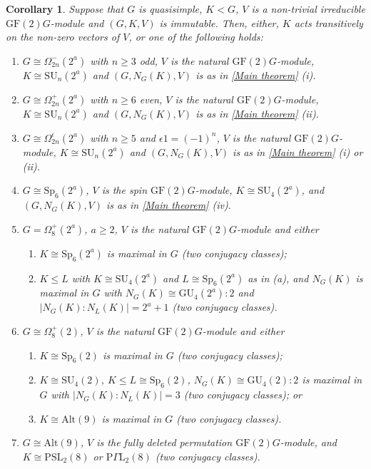 \documentclass[12pt]{amsart}
\newtheorem{corollary}[theorem]{Corollary}
\theoremstyle{remark}
\theoremstyle{notation}
\theoremstyle{definition}
\newcommand{\SU}{\mathrm{SU}}
\newcommand{\GF}{\mathrm{GF}}
\newcommand{\Sp}{\mathrm{Sp}}
\newcommand{\GU}{\mathrm{GU}}
\newcommand{\0}{\emptyset}
\newcommand{\PSL}{\mathrm{PSL}}
\newcommand{\Alt}{\mathrm{Alt}}
\begin{document}
 \begin{corollary}\label{Cor:Main Result} Suppose that $G$ is quasisimple, $K <G$, $V$ is a non-trivial irreducible $\GF(2)G$-module and $(G,K,V)$ is immutable.  Then, either, $K$ acts transitively on the non-zero vectors of $V$, or one of the following holds:
 \begin{enumerate}
 \item $G \cong \Omega_{2n}^-(2^a)$ with $n \ge 3$ odd,  $V$ is the natural $\GF(2)G$-module, $K \cong \SU_{n}(2^a)$ and $(G,N_G(K),V)$ is as in \cref{Main theorem} (i).

  \item $ G \cong \Omega_{2n}^+(2^a) $ with $ n \ge 6 $ even, $V$ is the natural $\GF(2)G$-module,
   $K \cong \SU_{n}(2^a)$ and $(G,N_G(K),V)$ is as in \cref{Main theorem} (ii).
 \item $G \cong \Omega_{2n}^\epsilon(2^a)$ with $n \ge 5$ and $\epsilon 1 =(-1)^n$,  $V$ is the natural $\GF(2)G$-module, $K \cong \SU_{n}(2^a)$ and $(G,N_G(K),V)$ is as in \cref{Main theorem} (i) or (ii).
 \item $G \cong \Sp_6(2^a)$, $V$ is the spin $\GF(2)G$-module, $K \cong \SU_4(2^a)$, and  $(G,N_G(K),V)$ is as in \cref{Main theorem} (iv).
 \item $G= \Omega_8^+(2^a)$,  $a\ge 2$, $V$ is the natural $\GF(2)G$-module and either
 \begin{enumerate} \item $K \cong \Sp_6(2^a)$ is maximal in $G$  (two conjugacy classes);
 \item $K \le L$ with $K \cong \SU_4(2^a)$  and  $L \cong \Sp_6(2^a)$ as in (a), and $N_G(K)$ is maximal in $G$ with $N_G(K) \cong \GU_4(2^a){:}2$ and $|N_G(K):N_L(K)|=2^a+1$ (two conjugacy classes).
 \end{enumerate}
 \item $G \cong \Omega_8^+(2)$,  $V$ is the natural $\GF(2)G$-module and either
 \begin{enumerate}
 \item $K \cong \Sp_6(2)$ is maximal in $G$  (two conjugacy  classes);
 \item $K \cong \SU_4(2)$, $K \le L \cong\Sp_6(2)$, $N_G(K) \cong \GU_4(2){:}2$ is maximal in $G$ with $|N_G(K): N_L(K)|=3$  (two conjugacy classes); or
 \item $K \cong \Alt(9)$ is maximal in $G$  (two conjugacy classes).
\end{enumerate}
\item $G \cong \Alt(9)$, $V$ is the fully deleted permutation $\GF(2)G$-module,  and $K \cong \PSL_2(8)$ or $\mathrm P \Gamma \mathrm L_2(8)$ (two conjugacy classes).
\end{enumerate}
  \end{corollary}
\end{document}

